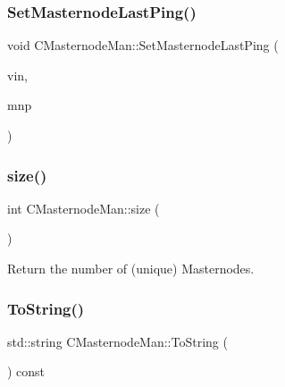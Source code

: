 \subsubsection{\texorpdfstring{Set\+Masternode\+Last\+Ping()}{SetMasternodeLastPing()}}
{\footnotesize\ttfamily void C\+Masternode\+Man\+::\+Set\+Masternode\+Last\+Ping (\begin{DoxyParamCaption}\item[{const C\+Tx\+In \&}]{vin,  }\item[{const \mbox{\hyperlink{class_c_masternode_ping}{C\+Masternode\+Ping}} \&}]{mnp }\end{DoxyParamCaption})}

\mbox{\label{class_c_masternode_man_a794ebfab7b09b51619a14d07306d817e}} 
\subsubsection{\texorpdfstring{size()}{size()}}
{\footnotesize\ttfamily int C\+Masternode\+Man\+::size (\begin{DoxyParamCaption}{ }\end{DoxyParamCaption})\hspace{0.3cm}{\ttfamily [inline]}}



Return the number of (unique) Masternodes. 

\mbox{\label{class_c_masternode_man_a7308c49a95bf9313a71a0b988256cfb4}} 
\subsubsection{\texorpdfstring{To\+String()}{ToString()}}
{\footnotesize\ttfamily std\+::string C\+Masternode\+Man\+::\+To\+String (\begin{DoxyParamCaption}{ }\end{DoxyParamCaption}) const}

\mbox{\label{class_c_masternode_man_a6625124a853d695c11d05218abad2910}} 
